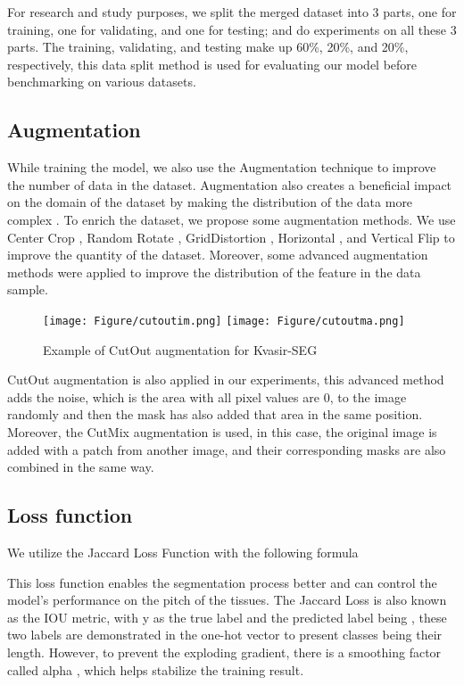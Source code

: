 \documentclass[conference]{IEEEtran}
\begin{document}
For research and study purposes, we split the merged dataset into 3 parts, one for training, one for validating, and one for testing; and do experiments on all these 3 parts. The training, validating, and testing make up 60\%, 20\%, and 20\%, respectively, this data  split method is used for evaluating our model before benchmarking on various datasets. 
\subsection{Augmentation}
While training the model, we also use the Augmentation technique to improve the number of data in the dataset. Augmentation also creates a beneficial impact on the domain of the dataset by making the distribution of the data more complex \cite{augmentation}.
To enrich the dataset, we propose some augmentation methods. We use Center Crop \cite{advanceaug}, Random Rotate \cite{advanceaug}, GridDistortion \cite{advanceaug}, Horizontal \cite{advanceaug}, and Vertical Flip to improve the quantity of the dataset. Moreover, some advanced augmentation methods were applied to improve the distribution of the feature in the data sample.
\begin{figure} [H]
    \centering
    \texttt{[image: Figure/cutoutim.png]}
    \texttt{[image: Figure/cutoutma.png]}
    \caption{Example of CutOut augmentation for Kvasir-SEG}
    \label{fig:cutout}
\end{figure}
CutOut augmentation \cite{devries2017improved} is also applied in our experiments, this advanced method adds the noise, which is the area with all pixel values are 0, to the image randomly and then the mask has also added that area in the same position. Moreover, the CutMix augmentation is used, in this case, the original image is added with a patch from another image, and their corresponding masks are also combined in the same way.





\subsection{Loss function}
We utilize the Jaccard Loss Function \cite{jaacaard} with the following formula 

This loss function enables the segmentation process better and can control the model's performance on the pitch of the tissues. The Jaccard Loss \cite{jaacaard} is also known as the IOU metric, with y as the true label and the predicted label being , these two labels are demonstrated in the one-hot vector to present classes  being their length. However, to prevent the exploding gradient, there is a smoothing factor called alpha , which helps stabilize the training result.
\end{document}

